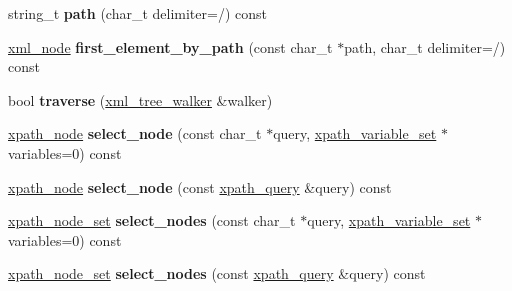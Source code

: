 \begin{DoxyCompactItemize}
\mbox{\label{classpugi_1_1xml__node_a058a28410f1b8a3c9bad487bc0cfbf07}} 
string\+\_\+t {\bfseries path} (char\+\_\+t delimiter=\textquotesingle{}/\textquotesingle{}) const
\item 
\mbox{\label{classpugi_1_1xml__node_abfbf17715dff4cc8b7ed4ed3671187da}} 
\hyperlink{classpugi_1_1xml__node}{xml\+\_\+node} {\bfseries first\+\_\+element\+\_\+by\+\_\+path} (const char\+\_\+t $\ast$path, char\+\_\+t delimiter=\textquotesingle{}/\textquotesingle{}) const
\item 
\mbox{\label{classpugi_1_1xml__node_a951d5d02987f75fabc4d575cfdeec8b4}} 
bool {\bfseries traverse} (\hyperlink{classpugi_1_1xml__tree__walker}{xml\+\_\+tree\+\_\+walker} \&walker)
\item 
\mbox{\label{classpugi_1_1xml__node_a6520ba214a97f4d45e978f51984589c7}} 
\hyperlink{classpugi_1_1xpath__node}{xpath\+\_\+node} {\bfseries select\+\_\+node} (const char\+\_\+t $\ast$query, \hyperlink{classpugi_1_1xpath__variable__set}{xpath\+\_\+variable\+\_\+set} $\ast$variables=0) const
\item 
\mbox{\label{classpugi_1_1xml__node_ae0ffd2e3a89a9f9ea97684652cd5983e}} 
\hyperlink{classpugi_1_1xpath__node}{xpath\+\_\+node} {\bfseries select\+\_\+node} (const \hyperlink{classpugi_1_1xpath__query}{xpath\+\_\+query} \&query) const
\item 
\mbox{\label{classpugi_1_1xml__node_adc95a2b782f54bce73347bc3e8d360f3}} 
\hyperlink{classpugi_1_1xpath__node__set}{xpath\+\_\+node\+\_\+set} {\bfseries select\+\_\+nodes} (const char\+\_\+t $\ast$query, \hyperlink{classpugi_1_1xpath__variable__set}{xpath\+\_\+variable\+\_\+set} $\ast$variables=0) const
\item 
\mbox{\label{classpugi_1_1xml__node_aecd03ef5900759c266bfe3decd6e993d}} 
\hyperlink{classpugi_1_1xpath__node__set}{xpath\+\_\+node\+\_\+set} {\bfseries select\+\_\+nodes} (const \hyperlink{classpugi_1_1xpath__query}{xpath\+\_\+query} \&query) const
\item 
\mbox{\label{classpugi_1_1xml__node_a154d3039043300b0706f519051730cbb}} 

\end{DoxyCompactItemize}
